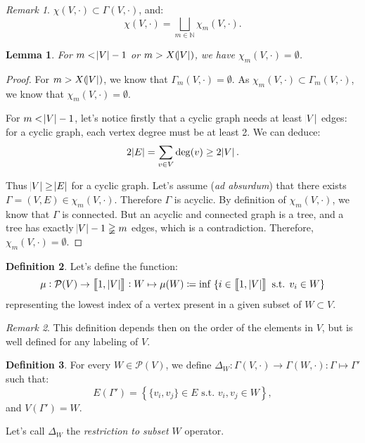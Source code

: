 \documentclass{article}
\newtheorem{lemma}{Lemma}[section]
\theoremstyle{definition}
\newtheorem{definition}[lemma]{Definition}
\theoremstyle{remark}
\newtheorem*{remark}{Remark}
\newcommand{\N}{\mathbb N}
\newcommand{\intint}[2]{\left\llbracket#1, \, #2\right\rrbracket}
\newcommand{\st}{\text{ s.t. }}
\begin{document}
		\begin{remark} $\chi(V, \cdot) \subset \Gamma(V, \cdot)$, and:
		\[\chi(V, \cdot) = \bigsqcup_{m \in \N}\chi_m(V, \cdot).\]
		\end{remark}

		\begin{lemma} For $m < \abs V-1$ or $m > X(\abs V)$, we have $\chi_m(V, \cdot) = \emptyset$.
		\end{lemma}

		\begin{proof} For $m > X(\abs V)$, we know that $\Gamma_m(V, \cdot) = \emptyset$. As $\chi_m(V, \cdot) \subset \Gamma_m(V, \cdot)$, we know that
		$\chi_m(V, \cdot) = \emptyset$.

		For $m < \abs V-1$, let's notice firstly that a cyclic graph needs at least $\abs V$ edges: for a cyclic graph, each vertex degree must be at least 2. We
		can deduce:
		\[2\abs E = \sum_{v \in V}\deg(v) \geq 2\abs V.\]

		Thus $\abs V \geq \abs E$ for a cyclic graph. Let's assume (\textit{ad absurdum}) that there exists $\Gamma = (V, E) \in \chi_m(V, \cdot)$. Therefore $\Gamma$ is acyclic.
		By definition of $\chi_m(V, \cdot)$, we know that $\Gamma$ is connected. But an acyclic and connected graph is a tree, and a tree has exactly
		$\abs V-1 \gneqq m$ edges, which is a contradiction. Therefore, $\chi_m(V, \cdot) = \emptyset$.
		\end{proof}

		\begin{definition}\label{def:mu function} Let's define the function:
		\[\mu : \mathcal P(V) \to \intint 1{\abs V} : W \mapsto \mu(W) \coloneqq \inf\; \{i \in \intint 1{\abs V} \st v_i \in W\}\]
		representing the lowest index of a vertex present in a given subset of $W \subset V$.
		\end{definition}

		\begin{remark} This definition depends then on the order of the elements in $V$, but is well defined for any labeling of $V$.
		\end{remark}

		\begin{definition} For every $W \in \mathcal P(V)$, we define $\Delta_W : \Gamma(V, \cdot) \to \Gamma(W, \cdot) : \Gamma \mapsto \Gamma'$
		such that:
		\[E(\Gamma') = \left\{\{v_i, v_j\} \in E \st v_i, v_j \in W\right\},\]
		and $V(\Gamma') = W$.

		Let's call $\Delta_W$ the \textit{restriction to subset $W$} operator.
		\end{definition}
\end{document}
